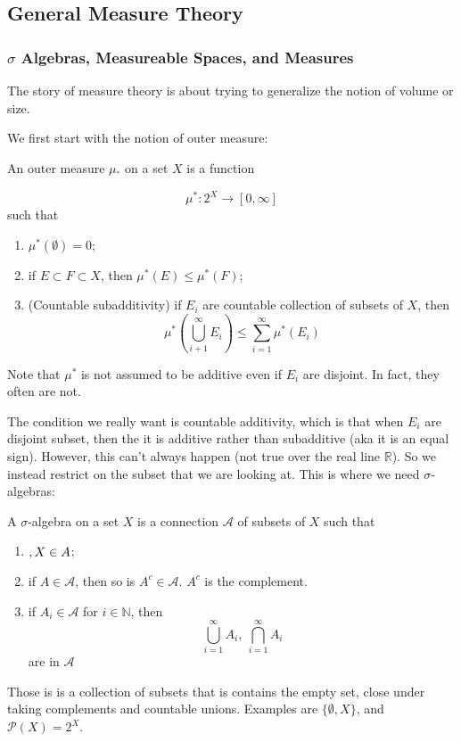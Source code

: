 \documentclass[main.tex]{subfiles}
\begin{document}
\subsection{General Measure Theory}

\subsubsection{$\sigma$ Algebras, Measureable Spaces, and Measures}
The story of measure theory is about trying to generalize the notion of volume or size. 

We first start with the notion of outer measure:

\begin{definition}
An outer measure $\mu_^*$ on a set $X$ is a function 

$$
\mu^* : 2^X \rightarrow [0, \infty]
$$ 
such that 
\begin{enumerate}
    \item $\mu^*(\emptyset) = 0$;
    \item if $E \subset F \subset X$, then $\mu^*(E) \leq \mu^*(F)$;
    \item (Countable subadditivity) if $E_i$ are countable collection of subsets of $X$, then 
    $$
    \mu^*(\bigcup_{i + 1} ^{\infty} E_i)\leq \sum_{i = 1} ^{\infty} \mu^*(E_i)
    $$
\end{enumerate}
\end{definition}
Note that $\mu^*$ is not assumed to be additive even if ${E_i}$ are disjoint. In fact, they often are not.

The condition we really want is countable additivity, which is that when $E_i$ are disjoint subset, then the it is additive rather than subadditive (aka it is an equal sign). However, this can't always happen (not true over the real line $\mathbb{R}$). So we instead restrict on the subset that we are looking at. This is where we need $\sigma$-algebras:

\begin{definition}
A $\sigma$-algebra on a set $X$ is a connection $\mathcal{A}$ of subsets of $X$ such that
\begin{enumerate}
    \item $\empty, X \in A$;
    \item if $A \in \mathcal{A}$, then so is $A^c \in \mathcal{A}$. $A^c$ is the complement.
    \item if $A_i \in \mathcal{A}$ for $i \in \mathbb{N}$, then 
    $$
    \bigcup_{i=1} ^{\infty} A_i,  \ \bigcap_{i=1} ^{\infty} A_i
    $$
    are in $\mathcal{A}$
\end{enumerate}
\end{definition}
Those is is a collection of subsets that is contains the empty set, close under taking complements and countable unions.
Examples are $\{ \emptyset, X \}$, and $\mathcal{P}(X) = 2^X$.
\end{document}
